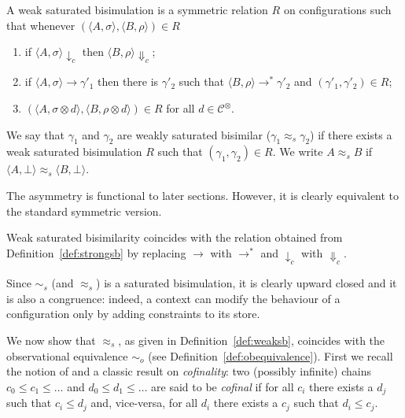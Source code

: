 \documentclass[main.tex]{subfiles}
\begin{document}
\begin{definition}\label{def:weaksb} A weak saturated bisimulation is a symmetric relation $R$ on configurations such that whenever
$( \langle A, \sigma \rangle,\langle B, \rho \rangle) \in R$
\begin{enumerate}
\item if $\langle A, \sigma \rangle \downarrow_c$ then $\langle B, \rho \rangle \Downarrow_c$;
\item if $\langle A, \sigma \rangle \longrightarrow \gamma'_1$ then there is $\gamma'_2$ such that $\langle B, \rho \rangle \longrightarrow^* \gamma'_2$ and $(\gamma'_1, \gamma'_2) \in R$;
\item $(\langle A,\sigma \otimes d\rangle, \langle B,\rho \otimes d \rangle) \in R$ for  all $d \in \mathcal{C}^\otimes$.
\end{enumerate}
We say that $\gamma_1$ and $\gamma_2$ are  weakly saturated bisimilar ($\gamma_1  \approx_{\mathit{s}} \gamma_2$) if there exists a  
weak saturated  bisimulation $R$ such that $(\gamma_1 , \gamma_2 ) \in R$. 
We write $A \approx_{\mathit{s}} B$ if $\langle A, \bot\rangle \approx_{\mathit{s}} \langle B, \bot \rangle$.
\end{definition}

The asymmetry is functional to later sections. However, it is clearly equivalent to the standard symmetric version.

\begin{definition}\label{def:weaksb2}
Weak saturated bisimilarity coincides with the relation 
obtained from Definition~\ref{def:strongsb} by replacing $\longrightarrow$ with $\longrightarrow^*$ and $\downarrow_c$ with $\Downarrow_c$.
\end{definition}

Since $\sim_{\mathit{s}}$ (and $\approx_{\mathit{s}}$) is a saturated bisimulation, it is clearly upward closed and it is also a congruence: indeed, a context can modify the behaviour of a configuration only by adding constraints to its store.

\medskip
We now show that $\approx_{\mathit{s}}$, as given in Definition~\ref{def:weaksb}, coincides with the observational equivalence $\sim_o$ (see Definition~\ref{def:obequivalence}). First we recall the notion of and a classic result on \emph{cofinality}: two (possibly infinite) chains $c_0 \leq c_1 \leq \dots$ and  $d_0 \leq d_1 \leq \dots$ are said to be \emph{cofinal} if for all $c_i$ there exists a $d_j$ such that $c_i \leq d_j$ and, vice-versa, for all $d_i$ there exists a $c_j$ such that $d_i \leq c_j$.
\end{document}
